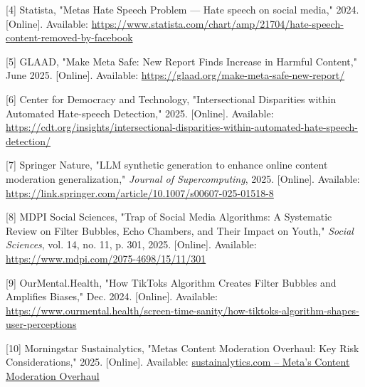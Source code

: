 {[}4{]} Statista, "Meta\textquotesingle s Hate Speech Problem --- Hate
speech on social media," 2024. {[}Online{]}. Available:
\url{https://www.statista.com/chart/amp/21704/hate-speech-content-removed-by-facebook}

{[}5{]} GLAAD, "Make Meta Safe: New Report Finds Increase in Harmful
Content," June 2025. {[}Online{]}. Available:
\url{https://glaad.org/make-meta-safe-new-report/}

{[}6{]} Center for Democracy and Technology, "Intersectional Disparities
within Automated Hate-speech Detection," 2025. {[}Online{]}. Available:
\url{https://cdt.org/insights/intersectional-disparities-within-automated-hate-speech-detection/}

{[}7{]} Springer Nature, "LLM synthetic generation to enhance online
content moderation generalization," \emph{Journal of Supercomputing},
2025. {[}Online{]}. Available:
\url{https://link.springer.com/article/10.1007/s00607-025-01518-8}

{[}8{]} MDPI Social Sciences, "Trap of Social Media Algorithms: A
Systematic Review on Filter Bubbles, Echo Chambers, and Their Impact on
Youth," \emph{Social Sciences}, vol. 14, no. 11, p. 301, 2025.
{[}Online{]}. Available:
\url{https://www.mdpi.com/2075-4698/15/11/301}

{[}9{]} OurMental.Health, "How TikTok\textquotesingle s Algorithm
Creates Filter Bubbles and Amplifies Biases," Dec. 2024. {[}Online{]}.
Available:
\url{https://www.ourmental.health/screen-time-sanity/how-tiktoks-algorithm-shapes-user-perceptions}

{[}10{]} Morningstar Sustainalytics, "Meta\textquotesingle s Content
Moderation Overhaul: Key Risk Considerations," 2025. {[}Online{]}.
Available:
\href{https://www.sustainalytics.com/esg-research/resource/investors-esg-blog/meta-s-content-moderation-overhaul}{sustainalytics.com -- Meta's Content Moderation Overhaul}
\fussy



